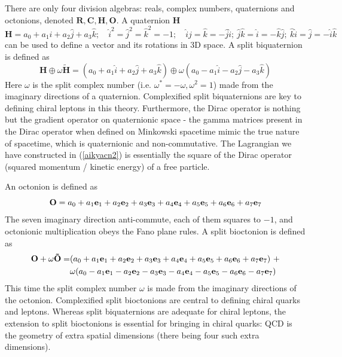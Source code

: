 \documentclass[a4paper]{jpconf}
\begin{document}
There are only four division algebras: reals, complex numbers, quaternions and octonions, denoted $\mathbf{R, C, H, O}$. A quaternion $\mathbf{H}$ 
\begin{equation}
\mathbf{H} = 
a_0 + a_1 \hat i + a_2 \hat j + a_3 \hat k; \quad \hat i^2 = \hat j^2 = \hat k^2 = -1;   \quad \hat i \hat j = \hat k = - \hat j \hat i;   \ \hat j \hat k = \hat i = - \hat k   \hat j;   \ \hat k \hat i = \hat j = - \hat i \hat k
\end{equation}
can be used to define a vector and its rotations in 3D space. A split biquaternion is defined as
\begin{equation}
\mathbf{H} \oplus \omega \mathbf {\tilde{H}} = (a_0 + a_1 \hat i + a_2 \hat j + a_3 \hat k) \oplus \omega (a_0 - a_1 \hat i - a_2 \hat j - a_3 \hat k)
\end{equation}
Here $\omega$ is the split complex number (i.e. $\omega^*=-\omega, \omega^2=1$) made from the imaginary directions of a quaternion. Complexified split biquaternions are key to defining chiral leptons in this theory. Furthermore, the Dirac operator is nothing but the gradient operator on quaternionic space - the gamma matrices present in the Dirac operator when defined on Minkowski spacetime mimic the true nature of spacetime, which is quaternionic and non-commutative. The Lagrangian we have constructed in (\ref{aikyacn2}) is essentially the square of the Dirac operator (squared momentum / kinetic energy) of a free particle.

An octonion is defined as \cite{Baez}
\begin{equation}
\mathbf{O} = a_0 + a_1 {\bf e}_1 + a_2 {\bf e}_2 + a_3 {\bf e}_3 + a_4 {\bf e}_4 + a_5 {\bf e}_5 + a_6 {\bf e}_6 + a_7 {\bf e}_7
\end{equation}
The seven imaginary direction anti-commute, each of them squares to $-1$, and octonionic multiplication obeys the Fano plane rules. A split bioctonion is defined as
\begin{equation}
\begin{split}
\mathbf{O} + \omega \mathbf{\tilde O}= & (a_0 + a_1 {\bf e}_1 + a_2 {\bf e}_2 + a_3 {\bf e}_3 + a_4 {\bf e}_4 + a_5 {\bf e}_5 + a_6 {\bf e}_6 + a_7 {\bf e}_7) \ + \\
& \omega(a_0 - a_1 {\bf e}_1 - a_2 {\bf e}_2 - a_3 {\bf e}_3 - a_4 {\bf e}_4 - a_5 {\bf e}_5 - a_6 {\bf e}_6 - a_7 {\bf e}_7)
\end{split}
\label{spbioc}
\end{equation}
This time the split complex number $\omega$ is made from the imaginary directions of the octonion. Complexified split bioctonions are central to defining chiral quarks and leptons. Whereas split biquaternions are adequate for chiral leptons, the extension to split bioctonions is essential for bringing in chiral quarks: QCD is the geometry of extra spatial dimensions (there being four such extra dimensions). 
\end{document}

